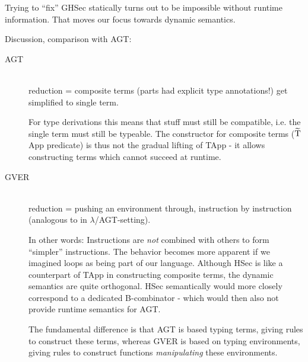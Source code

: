 \documentclass[11pt,a4paper]{article}
\begin{document}
Trying to “fix” GHSec statically turns out to be impossible without runtime information. That moves our focus towards dynamic semantics. 

Discussion, comparison with AGT:
\newcommand{\goal}{\ensuremath{\textrm{goal}_{\Gamma}}}
\newcommand{\TappVER}{\ensuremath{\textrm{TappVER}}}
\newcommand{\GTappVER}{\ensuremath{\grad{\textrm{T}}\textrm{appVER}}}
\begin{description}
	\item [AGT]~\\
	reduction = composite terms (parts had explicit type annotations!) get simplified to single term.
	
	For type derivations this means that stuff must still be compatible, i.e. the single term must still be typeable.
	The constructor for composite terms ($\widetilde{\text{T}}$App predicate) is thus not the gradual lifting of TApp - it allows constructing terms which cannot succeed at runtime.
	
	\item [GVER]~\\
	reduction = pushing an environment through, instruction by instruction (analogous to  in $\lambda$/AGT-setting).
	
	In other words: Instructions are \textit{not} combined with others to form “simpler” instructions.
	The behavior becomes more apparent if we imagined loops as being part of our language.
	Although HSec is like a counterpart of TApp in constructing composite terms, the dynamic semantics are quite orthogonal.
	HSec semantically would more closely correspond to a dedicated B-combinator - which would then also not provide runtime semantics for AGT.
	
	The fundamental difference is that AGT is based typing terms, giving rules to construct these terms, whereas GVER is based on typing environments, giving rules to construct functions \textit{manipulating} these environments.
	

\end{description}
\end{document}
